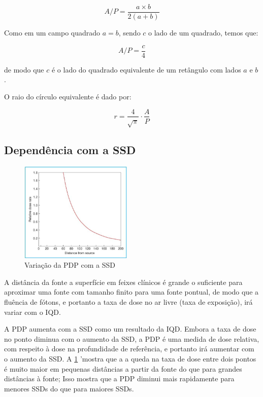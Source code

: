 \documentclass[11pt,a4paper]{article}
\begin{document}
	\begin{equation}
		A/P = \frac{a \times b}{2(a + b)}
	\end{equation}

	Como em um campo quadrado $a = b$, sendo $c$ o lado de um quadrado, temos que:

	\begin{equation}
		A/P = \frac{c}{4}
		\label{eq:quadradoEquivalente}
	\end{equation}

	de modo que $c$ é o lado do quadrado equivalente de um retângulo com lados $a$ e $b$.

	O raio do círculo equivalente é dado por:

	\begin{equation}
		r = \frac{4}{\sqrt{\pi}} \cdot \frac{A}{P}
		\label{eq:raioEquivalente}
	\end{equation}

	\subsection{Dependência com a SSD}

	\begin{figure}
		\centering
		\includegraphics[width=0.48\textwidth]{Imagens/pdpSsd.JPG}
		\caption{Variação da PDP com a SSD}
		\label{fig:pdpSsd}
	\end{figure}

	A distância da fonte a superfície em feixes clínicos é grande o suficiente para aproximar uma fonte com tamanho finito para uma fonte pontual, de modo que a fluência de fótons, e portanto a taxa de dose no ar livre (taxa de exposição), irá variar com o IQD. 

	A PDP aumenta com a SSD como um resultado da IQD. Embora a taxa de dose no ponto diminua com o aumento da SSD, a PDP é uma medida de dose relativa, com respeito à dose na profundidade de referência, e portanto irá aumentar com o aumento da SSD. A \ref{fig:pdpSsd} 'mostra que a a queda na taxa de dose entre dois pontos é muito maior em pequenas distâncias a partir da fonte do que para grandes distâncias à fonte; Isso mostra que a PDP diminui mais rapidamente para menores SSDs do que para maiores SSDs. 
\end{document}
